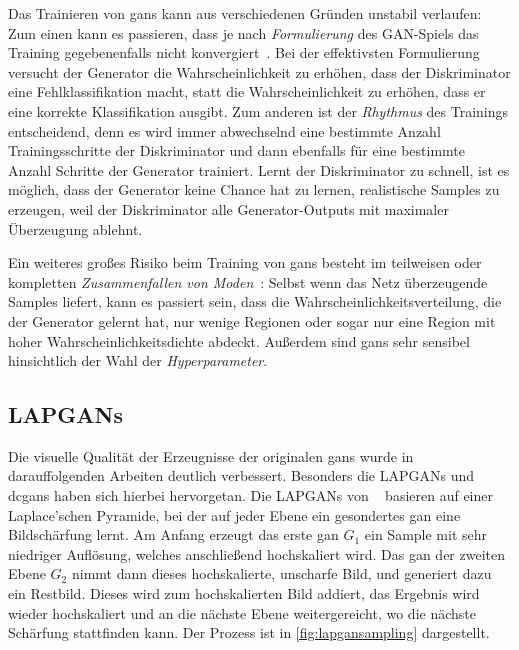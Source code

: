 Das Trainieren von \glspl{gan} kann aus verschiedenen Gründen unstabil verlaufen:
Zum einen kann es passieren, dass je nach \emph{Formulierung} des GAN-Spiels das Training gegebenenfalls nicht konvergiert~\cite{Goodfellow.2014}.
Bei der effektivsten Formulierung versucht der Generator die Wahrscheinlichkeit zu erhöhen, dass der Diskriminator eine Fehlklassifikation macht, statt die Wahrscheinlichkeit zu erhöhen, dass er eine korrekte Klassifikation ausgibt.
Zum anderen ist der \emph{Rhythmus} des Trainings entscheidend, denn es wird immer abwechselnd eine bestimmte Anzahl Trainingsschritte der Diskriminator und dann ebenfalls für eine bestimmte Anzahl Schritte der Generator trainiert.
Lernt der Diskriminator zu schnell, ist es möglich, dass der Generator keine Chance hat zu lernen, realistische Samples zu erzeugen, weil der Diskriminator alle Generator-Outputs mit maximaler Überzeugung ablehnt.

Ein weiteres großes Risiko beim Training von \glspl{gan} besteht im teilweisen oder kompletten \emph{Zusammenfallen von Moden}~\cite{Che.2016}:
Selbst wenn das Netz überzeugende Samples liefert, kann es passiert sein, dass die Wahrscheinlichkeitsverteilung, die der Generator gelernt hat, nur wenige Regionen oder sogar nur eine Region mit hoher Wahrscheinlichkeitsdichte abdeckt.
Außerdem sind \glspl{gan} sehr sensibel hinsichtlich der Wahl der \emph{Hyperparameter}.



\subsection{LAPGANs}

Die visuelle Qualität der Erzeugnisse der originalen \glspl{gan} wurde in darauffolgenden Arbeiten deutlich verbessert.
Besonders die LAPGANs und \glspl{dcgan} haben sich hierbei hervorgetan.
Die LAPGANs von \citeauthor{Denton.2015}~\cite{Denton.2015} basieren auf einer Laplace'schen Pyramide, bei der auf jeder Ebene ein gesondertes \gls{gan} eine Bildschärfung lernt.
Am Anfang erzeugt das erste \gls{gan} $ G_1 $ ein Sample mit sehr niedriger Auflösung, welches anschließend hochskaliert wird.
Das \gls{gan} der zweiten Ebene $ G_2 $ nimmt dann dieses hochskalierte, unscharfe Bild, und generiert dazu ein Restbild.
Dieses wird zum hochskalierten Bild addiert, das Ergebnis wird wieder hochskaliert und an die nächste Ebene weitergereicht, wo die nächste Schärfung stattfinden kann.
Der Prozess ist in \autoref{fig:lapgansampling} dargestellt.

